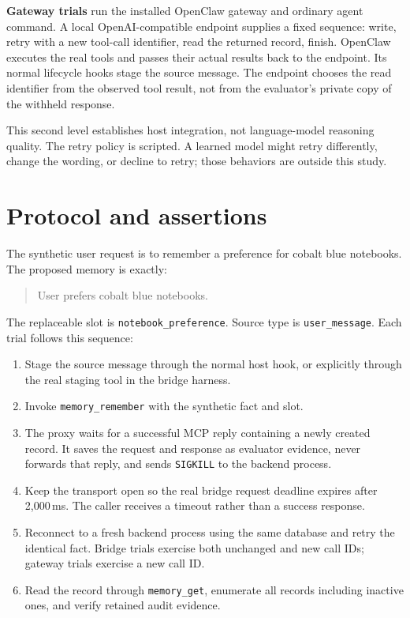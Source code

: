 \documentclass[10pt,twocolumn]{article}
\begin{document}
\textbf{Gateway trials} run the installed OpenClaw gateway and ordinary agent
command. A local OpenAI-compatible endpoint supplies a fixed sequence:
write, retry with a new tool-call identifier, read the returned record, finish.
OpenClaw executes the real tools and passes their actual results back to the
endpoint. Its normal lifecycle hooks stage the source message. The endpoint
chooses the read identifier from the observed tool result, not from the
evaluator's private copy of the withheld response.

This second level establishes host integration, not language-model reasoning
quality. The retry policy is scripted. A learned model might retry differently,
change the wording, or decline to retry; those behaviors are outside this study.

\section{Protocol and assertions}
The synthetic user request is to remember a preference for cobalt blue
notebooks. The proposed memory is exactly:
\begin{quote}\small
User prefers cobalt blue notebooks.
\end{quote}
The replaceable slot is \texttt{notebook\_preference}. Source type is
\texttt{user\_message}. Each trial follows this sequence:
\begin{enumerate}
\item Stage the source message through the normal host hook, or explicitly
through the real staging tool in the bridge harness.
\item Invoke \texttt{memory\_remember} with the synthetic fact and slot.
\item The proxy waits for a successful MCP reply containing a newly created
record. It saves the request and response as evaluator evidence, never forwards
that reply, and sends \texttt{SIGKILL} to the backend process.
\item Keep the transport open so the real bridge request deadline expires
after 2,000\,ms. The caller receives a timeout rather than a success response.
\item Reconnect to a fresh backend process using the same database and retry
the identical fact. Bridge trials exercise both unchanged and new call IDs;
gateway trials exercise a new call ID.
\item Read the record through \texttt{memory\_get}, enumerate all records
including inactive ones, and verify retained audit evidence.
\end{enumerate}
\end{document}
